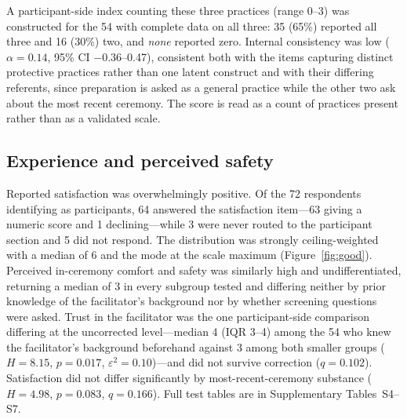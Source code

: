 \documentclass[12pt]{article}
\begin{document}
A participant-side index counting these three practices (range 0--3) was constructed for the 54 with
complete data on all three: 35 (65\%) reported all three and 16 (30\%) two, and \emph{none} reported zero.
Internal consistency was low ($\alpha = 0.14$, 95\% CI $-0.36$--0.47), consistent both with the items
capturing distinct protective practices rather than one latent construct and with their differing
referents, since preparation is asked as a general practice while the other two ask about the most recent
ceremony. The score is read as a count of practices present rather than as a validated scale.

\subsection{Experience and perceived safety}

Reported satisfaction was overwhelmingly positive. Of the 72 respondents identifying as participants, 64
answered the satisfaction item---63 giving a numeric score and 1 declining---while 3 were never routed to
the participant section and 5 did not respond. The distribution was strongly ceiling-weighted with a median
of 6 and the mode at the scale maximum (Figure~\ref{fig:good}). Perceived in-ceremony comfort and safety
was similarly high and undifferentiated, returning a median of 3 in every subgroup tested and differing
neither by prior knowledge of the facilitator's background nor by whether screening questions were asked.
Trust in the facilitator was the one participant-side comparison differing at the uncorrected
level---median 4 (IQR 3--4) among the 54 who knew the facilitator's background beforehand against 3 among
both smaller groups ($H=8.15$, $p=0.017$, $\varepsilon^2=0.10$)---and did not survive correction
($q=0.102$). Satisfaction did not differ significantly by most-recent-ceremony substance ($H=4.98$,
$p=0.083$, $q=0.166$). Full test tables are in Supplementary Tables~S4--S7.
\end{document}
